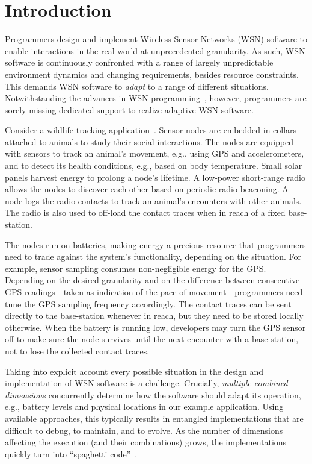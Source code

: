 \section{Introduction} 
 

Programmers design and implement Wireless Sensor Networks (WSN)
software to enable interactions in the real world at unprecedented
granularity. As such, WSN software is continuously confronted with a
range of largely unpredictable environment dynamics and changing
requirements, besides resource constraints. This demands WSN software
to \emph{adapt} to a range of different situations. Notwithstanding
the advances in WSN programming~\cite{mottola10:survey}, however,
programmers are sorely missing dedicated support to realize adaptive
WSN software.

 Consider a wildlife tracking
application~\cite{pasztor10:selective}. Sensor nodes are embedded in
collars attached to animals to study their social interactions. The
nodes are equipped with sensors to track an animal's movement, e.g.,
using GPS and accelerometers, and to detect its health conditions,
e.g., based on body temperature. Small solar panels harvest energy to
prolong a node's lifetime. A low-power short-range radio allows the
nodes to discover each other based on periodic radio beaconing.  A
node logs the radio contacts to track an animal's encounters with
other animals. The radio is also used to off-load the contact traces
when in reach of a fixed base-station.

The nodes run on batteries, making energy a precious resource that
programmers need to trade against the system's functionality,
depending on the situation. For example, sensor sampling consumes
non-negligible energy for the GPS. Depending on the desired
granularity and on the difference between consecutive GPS
readings---taken as indication of the pace of movement---programmers
need tune the GPS sampling frequency accordingly. The contact traces
can be sent directly to the base-station whenever in reach, but they
need to be stored locally otherwise.  When the battery is running low,
developers may turn the GPS sensor off to make sure the node survives
until the next encounter with a base-station, not to lose the
collected contact traces.

 Taking into explicit account every possible
situation in the design and implementation of WSN software is a
challenge. Crucially, \emph{multiple combined dimensions} concurrently
determine how the software should adapt its operation, e.g., battery
levels and physical locations in our example application. Using
available approaches, this typically results in entangled
implementations that are difficult to debug, to maintain, and to
evolve.  As the number of dimensions affecting the execution (and
their combinations) grows, the implementations quickly turn into
``spaghetti code''~\cite{finne10improving}.

